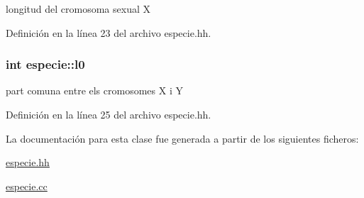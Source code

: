 longitud del cromosoma sexual X 



Definición en la línea 23 del archivo especie.\+hh.

\subsubsection[{\texorpdfstring{l0}{l0}}]{\setlength{\rightskip}{0pt plus 5cm}int especie\+::l0\hspace{0.3cm}{\ttfamily [private]}}\hypertarget{classespecie_a7e4448f0f61a573753aa7000ad073982}{}\label{classespecie_a7e4448f0f61a573753aa7000ad073982}


part comuna entre els cromosomes X i Y 



Definición en la línea 25 del archivo especie.\+hh.



La documentación para esta clase fue generada a partir de los siguientes ficheros\+:\begin{DoxyCompactItemize}
\item 
\hyperlink{especie_8hh}{especie.\+hh}\item 
\hyperlink{especie_8cc}{especie.\+cc}\end{DoxyCompactItemize}
